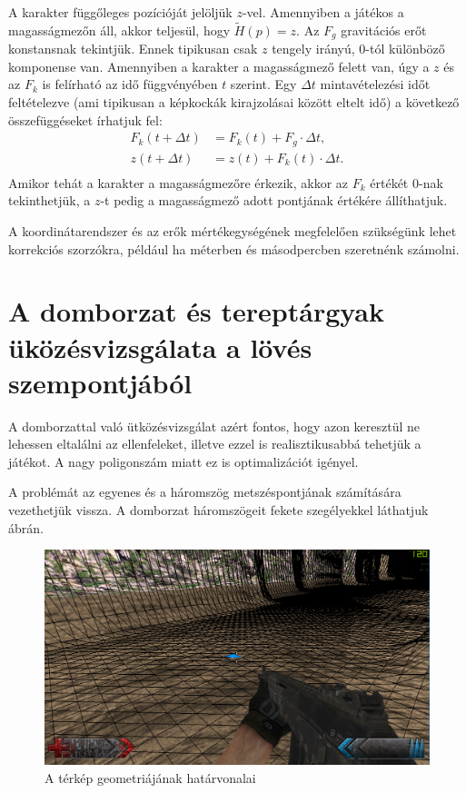 A karakter függőleges pozícióját jelöljük $z$-vel. Amennyiben a játékos a magasságmezőn áll, akkor teljesül, hogy $\widetilde{H}(p) = z$. Az $F_g$ gravitációs erőt konstansnak tekintjük. Ennek tipikusan csak $z$ tengely irányú, $0$-tól különböző komponense van. Amennyiben a karakter a magasságmező felett van, úgy a $z$ és az $F_k$ is felírható az idő függvényében $t$ szerint. Egy $\Delta t$ mintavételezési időt feltételezve (ami tipikusan a képkockák kirajzolásai között eltelt idő) a következő összefüggéseket írhatjuk fel:
\begin{align*}
F_k(t + \Delta t) &= F_k(t) + F_g \cdot \Delta t, \\
z(t + \Delta t) &= z(t) + F_k(t) \cdot \Delta t. \\
\end{align*}
Amikor tehát a karakter a magasságmezőre érkezik, akkor az $F_k$ értékét $0$-nak tekinthetjük, a $z$-t pedig a magasságmező adott pontjának értékére állíthatjuk.

A koordinátarendszer és az erők mértékegységének megfelelően szükségünk lehet korrekciós szorzókra, például ha méterben és másodpercben szeretnénk számolni.
 
\section{A domborzat és tereptárgyak üközésvizsgálata a lövés szempontjából}

A domborzattal való ütközésvizsgálat azért fontos, hogy azon keresztül ne lehessen eltalálni az ellenfeleket, illetve ezzel is realisztikusabbá tehetjük a játékot. A nagy poligonszám miatt ez is optimalizációt igényel.

A problémát az egyenes és a háromszög metszéspontjának számítására vezethetjük vissza. A domborzat háromszögeit fekete szegélyekkel láthatjuk  ábrán.

\begin{figure}[h]
\centering
\includegraphics[scale=0.4]{kepek/map_wireframe.png}
\caption{A térkép geometriájának határvonalai}
\label{fig:wireframe}
\end{figure}

